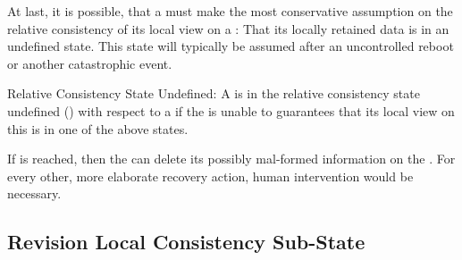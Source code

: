 \documentclass[a4paper, 12pt]{book}
\begin{document}
At last, it is possible, that a  must make the most conservative
assumption on the relative consistency of its local view on a : That its
locally retained data is in an undefined state. 
%
This state will typically be assumed after an uncontrolled reboot or another
catastrophic event. 
%
\begin{definition*}{Relative Consistency State Undefined: \revrelconstateUNDEFINED} %
  A  is in the relative consistency state undefined
  (\revrelconstateUNDEFINED) with respect to a  if the
   is unable to guarantees that its local view on this
   is in one of the above states. 
\end{definition*}
%
If \revrelconstateUNDEFINED is reached, then the  can delete its
possibly mal-formed information on the . For every other, more
elaborate recovery action, human intervention would be necessary.

\subsection{Revision Local Consistency Sub-State}
\end{document}
